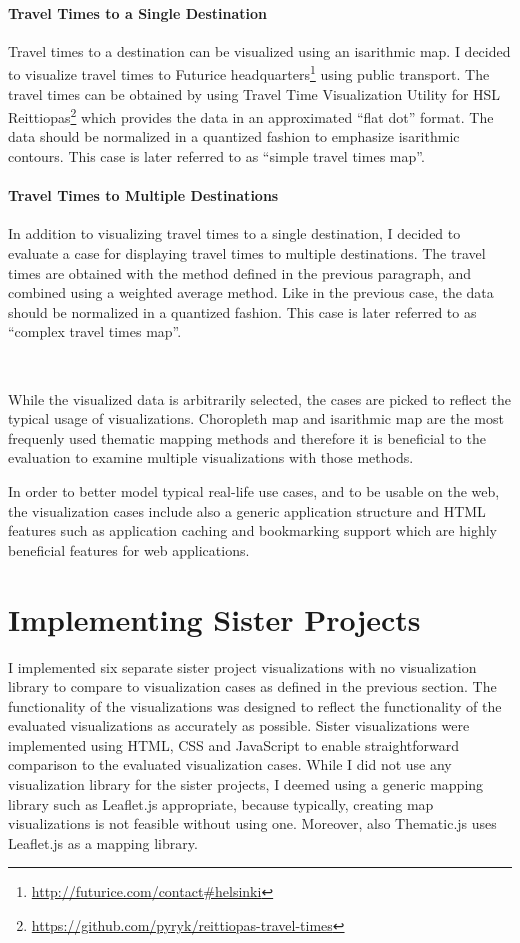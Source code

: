 \paragraph{Travel Times to a Single Destination}
Travel times to a destination can be visualized using an isarithmic map. I decided to visualize travel times to Futurice headquarters\footnote{\url{http://futurice.com/contact\#helsinki}} using public transport. The travel times can be obtained by using Travel Time Visualization Utility for HSL Reittiopas\footnote{\url{https://github.com/pyryk/reittiopas-travel-times}} which provides the data in an approximated ``flat dot'' format. The data should be normalized in a quantized fashion to emphasize isarithmic contours. This case is later referred to as ``simple travel times map''.

\paragraph{Travel Times to Multiple Destinations}
In addition to visualizing travel times to a single destination, I decided to evaluate a case for displaying travel times to multiple destinations. The travel times are obtained with the method defined in the previous paragraph, and combined using a weighted average method. Like in the previous case, the data should be normalized in a quantized fashion. This case is later referred to as ``complex travel times map''.

~

While the visualized data is arbitrarily selected, the cases are picked to reflect the typical usage of visualizations. Choropleth map and isarithmic map are the most frequenly used thematic mapping methods \citep[chap.~14-15]{slocum_thematic_2014} and therefore it is beneficial to the evaluation to examine multiple visualizations with those methods.

In order to better model typical real-life use cases, and to be usable on the web, the visualization cases include also a generic application structure and HTML features such as application caching and bookmarking support which are highly beneficial features for web applications.

\section{Implementing Sister Projects}

I implemented six separate sister project visualizations with no visualization library to compare to visualization cases as defined in the previous section. The functionality of the visualizations was designed to reflect the functionality of the evaluated visualizations as accurately as possible. Sister visualizations were implemented using HTML, CSS and JavaScript to enable straightforward comparison to the evaluated visualization cases. While I did not use any visualization library for the sister projects, I deemed using a generic mapping library such as Leaflet.js appropriate, because typically, creating map visualizations is not feasible without using one. Moreover, also Thematic.js uses Leaflet.js as a mapping library.

